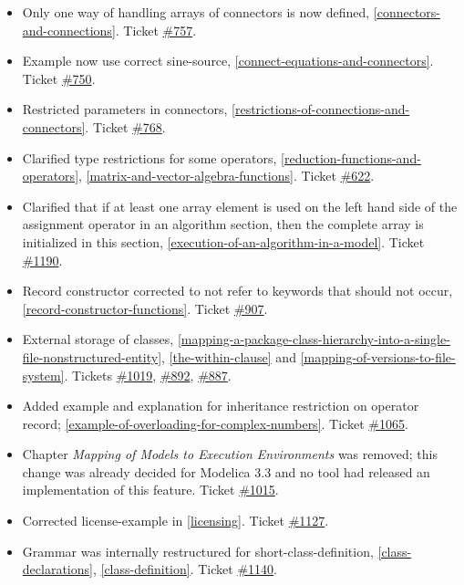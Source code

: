 \begin{itemize}
\item
  Only one way of handling arrays of connectors is now defined,
  \autoref{connectors-and-connections}. Ticket \href{https://github.com/modelica/ModelicaSpecification/issues/757}{\#757}.
\item
  Example now use correct sine-source, \autoref{connect-equations-and-connectors}. Ticket
  \href{https://github.com/modelica/ModelicaSpecification/issues/750}{\#750}.
\item
  Restricted parameters in connectors, \autoref{restrictions-of-connections-and-connectors}. Ticket
  \href{https://github.com/modelica/ModelicaSpecification/issues/768}{\#768}.
\item
  Clarified type restrictions for some operators, \autoref{reduction-functions-and-operators},
  \autoref{matrix-and-vector-algebra-functions}. Ticket
  \href{https://github.com/modelica/ModelicaSpecification/issues/622}{\#622}.
\item
  Clarified that if at least one array element is used on the left hand
  side of the assignment operator in an algorithm section, then the
  complete array is initialized in this section, \autoref{execution-of-an-algorithm-in-a-model}. Ticket
  \href{https://github.com/modelica/ModelicaSpecification/issues/1190}{\#1190}.
\item
  Record constructor corrected to not refer to keywords that should not
  occur, \autoref{record-constructor-functions}. Ticket
  \href{https://github.com/modelica/ModelicaSpecification/issues/907}{\#907}.
\item
  External storage of classes, \autoref{mapping-a-package-class-hierarchy-into-a-single-file-nonstructured-entity},
  \autoref{the-within-clause} and \autoref{mapping-of-versions-to-file-system}.
  Tickets \href{https://github.com/modelica/ModelicaSpecification/issues/1019}{\#1019},
  \href{https://github.com/modelica/ModelicaSpecification/issues/892}{\#892},
  \href{https://github.com/modelica/ModelicaSpecification/issues/887}{\#887}.
\item
  Added example and explanation for inheritance restriction on operator
  record; \autoref{example-of-overloading-for-complex-numbers}. Ticket
  \href{https://github.com/modelica/ModelicaSpecification/issues/1065}{\#1065}.
\item
  Chapter \emph{Mapping of Models to Execution Environments} was removed;
  this change was already decided for Modelica 3.3 and no tool had
  released an implementation of this feature. Ticket
  \href{https://github.com/modelica/ModelicaSpecification/issues/1015}{\#1015}.
\item
  Corrected license-example in \autoref{licensing}. Ticket
  \href{https://github.com/modelica/ModelicaSpecification/issues/1127}{\#1127}.
\item
  Grammar was internally restructured for short-class-definition,
  \autoref{class-declarations}, \autoref{class-definition}. Ticket
  \href{https://github.com/modelica/ModelicaSpecification/issues/1140}{\#1140}.
\end{itemize}

